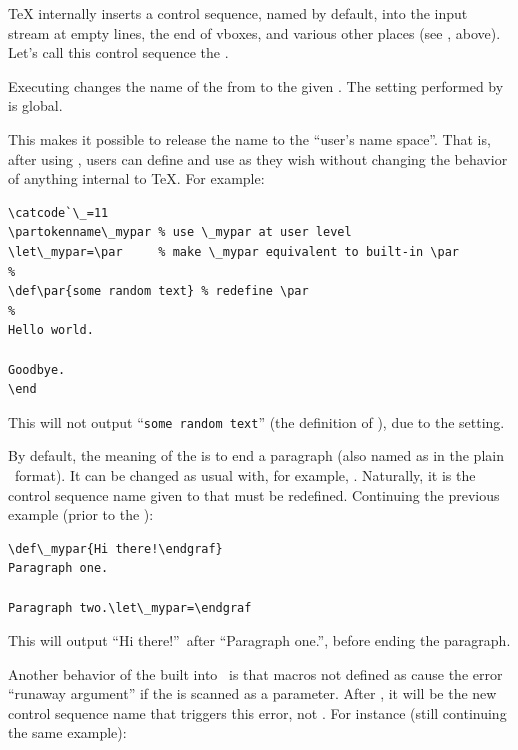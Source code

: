 \documentclass{pdftexmanual}
\begin{document}
\TeX{} internally inserts a control sequence, named  by
default, into the input stream at empty lines, the end of vboxes, and
various other places (see , above). Let's call this
control sequence the .

Executing  changes the
name of the  from  to the given
. The setting performed by
 is global.

This makes it possible to release the name  to the ``user's name
space''. That is, after using , users can define and
use  as they wish without changing the behavior of anything
internal to \TeX{}. For example:

\begin{verbatim}
\catcode`\_=11
\partokenname\_mypar % use \_mypar at user level
\let\_mypar=\par     % make \_mypar equivalent to built-in \par
%
\def\par{some random text} % redefine \par
%
Hello world.

Goodbye.
\end
\end{verbatim}

This will not output ``\verb|some random text|'' (the definition of
), due to the  setting.

By default, the meaning of the  is to end a paragraph
(also named as  in the plain \TEX\ format). It can be
changed as usual with, for example, . Naturally, it is the
control sequence name given to  that must be
redefined. Continuing the previous example (prior to the ):

\begin{verbatim}
\def\_mypar{Hi there!\endgraf}
Paragraph one.

Paragraph two.\let\_mypar=\endgraf
\end{verbatim}

This will output ``Hi there!''\ after ``Paragraph one.'', before ending
the paragraph.

Another behavior of the  built into \TEX\ is that
macros not defined as  cause the error ``runaway argument'' if
the  is scanned as a parameter. After
, it will be the new control sequence name that
triggers this error, not . For instance (still continuing the
same example):
\end{document}
